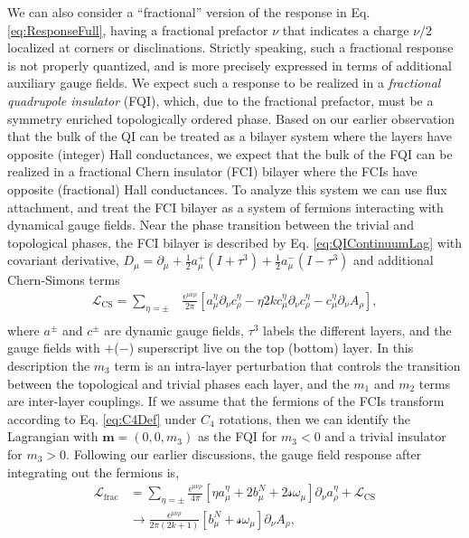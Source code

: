 \documentclass[%
 reprint,
 amsmath,amssymb,
 aps,
]{revtex4-1}
\begin{document}
We can also consider a ``fractional'' version of the response in Eq. \ref{eq:ResponseFull}, having a fractional prefactor $\nu$ that indicates a charge $\nu/2$ localized at corners or disclinations. Strictly speaking, such a fractional response is not properly quantized, and is more precisely expressed in terms of additional auxiliary gauge fields. We expect such a response to be realized in a \textit{fractional quadrupole insulator} (FQI), which, due to the fractional prefactor, must be a symmetry enriched topologically ordered phase\cite{lu2016classification}. 
Based on our earlier observation that the bulk of the QI can be treated as a bilayer system where the layers have opposite (integer) Hall conductances, we expect that the bulk of the FQI can be realized in a fractional Chern insulator (FCI) bilayer where the FCIs have opposite (fractional) Hall conductances. To analyze this system we can use flux attachment, and treat the FCI bilayer as a system of fermions interacting with dynamical gauge fields\cite{fradkin2013field,sohal2018chern}. Near the phase transition between the trivial and topological phases, the FCI bilayer is described by Eq. \ref{eq:QIContinuumLag} with covariant derivative, $D_\mu = \partial_\mu + \frac{1}{2}a^+_\mu(I + \tau^3) + \frac{1}{2}a^-_\mu(I - \tau^3)$ and additional Chern-Simons terms
\begin{equation}\begin{split}
\mathcal{L}_{\text{CS}} = \sum_{\eta = \pm }&\frac{\epsilon^{\mu\nu\rho}}{2\pi}\left[ a^{\eta}_\mu \partial_\nu c^{\eta}_\rho - \eta2k c^{\eta}_\mu \partial_\nu c^{\eta}_\rho - c^{\eta}_\mu \partial_\nu A_\rho \right],\\
\end{split}\end{equation}
where $a^{\pm}$ and $c^{\pm}$ are dynamic gauge fields\cite{lee2018emergent},  $\tau^3$ labels the different layers, and the gauge fields with $+$($-$) superscript live on the top (bottom) layer.
In this description the $m_3$ term is an intra-layer perturbation that controls the transition between the topological and trivial phases each layer, and the $m_1$ and $m_2$ terms are inter-layer couplings. If we assume that the fermions of the FCIs transform according to Eq. \ref{eq:C4Def} under $C_4$ rotations, then we can identify the Lagrangian with $\bm{m} =(0,0,m_3)$ as the FQI for $m_3<0$ and a trivial insulator for $m_3>0$. Following our earlier discussions, the gauge field response after integrating out the fermions is,\begin{equation}\begin{split}
\mathcal{L}_{\text{frac}} &= \sum_{\eta = \pm}\frac{\epsilon^{\mu\nu\rho}}{4\pi}\left[\eta a^{\eta}_\mu + 2b^N_\mu +2\mathscr{s}\omega_\mu \right]\partial_\nu  a^{\eta}_\rho  +  \mathcal{L}_{\text{CS}} \\
&\rightarrow \frac{\epsilon^{\mu\nu\rho}}{2\pi(2k+1)}\left[b^N_\mu + \mathscr{s} \omega_\mu \right]\partial_\nu A_\rho,
\end{split}\end{equation}
\end{document}
